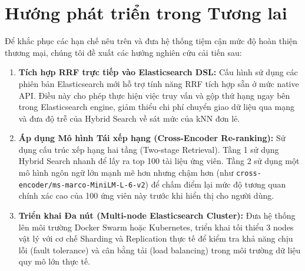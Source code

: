 \section{Hướng phát triển trong Tương lai}
Để khắc phục các hạn chế nêu trên và đưa hệ thống tiệm cận mức độ hoàn thiện thương mại, chúng tôi đề xuất các hướng nghiên cứu cải tiến sau:
\begin{enumerate}
    \item \textbf{Tích hợp RRF trực tiếp vào Elasticsearch DSL:} Cấu hình sử dụng các phiên bản Elasticsearch mới hỗ trợ tính năng RRF tích hợp sẵn ở mức native API. Điều này cho phép thực hiện việc truy vấn và gộp thứ hạng ngay bên trong Elasticsearch engine, giảm thiểu chi phí chuyển giao dữ liệu qua mạng và đưa độ trễ của Hybrid Search về sát mức của kNN đơn lẻ.
    \item \textbf{Áp dụng Mô hình Tái xếp hạng (Cross-Encoder Re-ranking):} Sử dụng cấu trúc xếp hạng hai tầng (Two-stage Retrieval). Tầng 1 sử dụng Hybrid Search nhanh để lấy ra top 100 tài liệu ứng viên. Tầng 2 sử dụng một mô hình ngôn ngữ lớn mạnh mẽ hơn nhưng chậm hơn (như \texttt{cross-encoder/ms-marco-MiniLM-L-6-v2}) để chấm điểm lại mức độ tương quan chính xác cao của 100 ứng viên này trước khi hiển thị cho người dùng.
    \item \textbf{Triển khai Đa nút (Multi-node Elasticsearch Cluster):} Đưa hệ thống lên môi trường Docker Swarm hoặc Kubernetes, triển khai tối thiểu 3 nodes vật lý với cơ chế Sharding và Replication thực tế để kiểm tra khả năng chịu lỗi (fault tolerance) và cân bằng tải (load balancing) trong môi trường dữ liệu quy mô lớn thực tế.
\end{enumerate}
